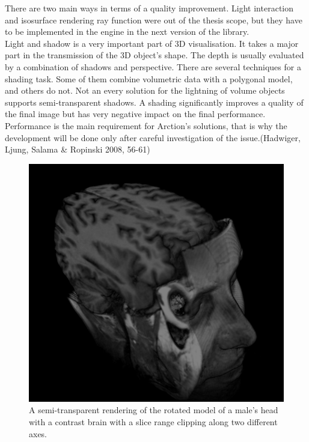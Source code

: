 \documentclass[twoside, english, 11pt]{report}
\begin{document}
There are two main ways in terms of a quality improvement. Light interaction and isosurface rendering ray function were out of the thesis scope, but they have to be implemented in the engine in the next version of the library.\\

Light and shadow is a very important part of 3D visualisation. It takes a major part in the transmission of the 3D object's shape. The depth is usually evaluated by a combination of shadows and perspective. There are several techniques for a shading task. Some of them combine volumetric data with a polygonal model, and others do not. Not an every solution for the lightning of volume objects supports semi-transparent shadows. A shading significantly improves a quality of the final image but has very negative impact on the final performance. Performance is the main requirement for Arction's solutions, that is why the development will be done only after careful investigation of the issue.(Hadwiger, Ljung, Salama \& Ropinski 2008, 56-61)\\


\begin{figure}[H]
\centerline{\includegraphics[scale = 0.7]{img/cuttedhead}}
\caption{A semi-transparent rendering of the rotated model of a male's head with a contrast brain with a slice range clipping along two different axes.\label{fig:cuttedhead}}
\end{figure}
\end{document}
